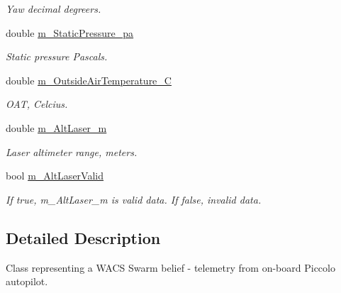 \begin{DoxyCompactItemize}
\begin{DoxyCompactList}\small\item\em Yaw decimal degreers. \end{DoxyCompactList}\item 
\hypertarget{class_piccolo_telemetry_belief_ae0073530294cf46d6014891e3ade0ea8}{
double \hyperlink{class_piccolo_telemetry_belief_ae0073530294cf46d6014891e3ade0ea8}{m\_\-StaticPressure\_\-pa}}
\label{class_piccolo_telemetry_belief_ae0073530294cf46d6014891e3ade0ea8}

\begin{DoxyCompactList}\small\item\em Static pressure Pascals. \end{DoxyCompactList}\item 
\hypertarget{class_piccolo_telemetry_belief_af970a072ba67cfbe8dbcb6ddeeee23f3}{
double \hyperlink{class_piccolo_telemetry_belief_af970a072ba67cfbe8dbcb6ddeeee23f3}{m\_\-OutsideAirTemperature\_\-C}}
\label{class_piccolo_telemetry_belief_af970a072ba67cfbe8dbcb6ddeeee23f3}

\begin{DoxyCompactList}\small\item\em OAT, Celcius. \end{DoxyCompactList}\item 
\hypertarget{class_piccolo_telemetry_belief_a0a876ff0c2f66dbf2a74d7f42329b4fa}{
double \hyperlink{class_piccolo_telemetry_belief_a0a876ff0c2f66dbf2a74d7f42329b4fa}{m\_\-AltLaser\_\-m}}
\label{class_piccolo_telemetry_belief_a0a876ff0c2f66dbf2a74d7f42329b4fa}

\begin{DoxyCompactList}\small\item\em Laser altimeter range, meters. \end{DoxyCompactList}\item 
\hypertarget{class_piccolo_telemetry_belief_a075e67c0fdc179385116a15a957f4a21}{
bool \hyperlink{class_piccolo_telemetry_belief_a075e67c0fdc179385116a15a957f4a21}{m\_\-AltLaserValid}}
\label{class_piccolo_telemetry_belief_a075e67c0fdc179385116a15a957f4a21}

\begin{DoxyCompactList}\small\item\em If true, m\_\-AltLaser\_\-m is valid data. If false, invalid data. \end{DoxyCompactList}\end{DoxyCompactItemize}


\subsection{Detailed Description}
Class representing a WACS Swarm belief -\/ telemetry from on-\/board Piccolo autopilot. 


